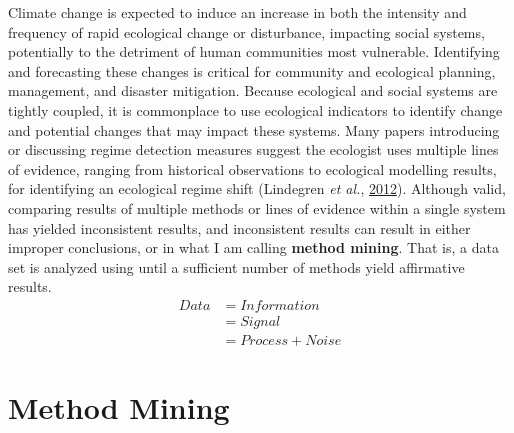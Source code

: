 \documentclass[12pt,twoside,openany]{reedthesis}
\begin{document}
Climate change is expected to induce an increase in both the intensity and frequency of rapid ecological change or disturbance, impacting social systems, potentially to the detriment of human communities most vulnerable. Identifying and forecasting these changes is critical for community and ecological planning, management, and disaster mitigation. Because ecological and social systems are tightly coupled, it is commonplace to use ecological indicators to identify change and potential changes that may impact these systems. Many papers introducing or discussing regime detection measures suggest the ecologist uses multiple lines of evidence, ranging from historical observations to ecological modelling results, for identifying an ecological regime shift (Lindegren \emph{et al.}, \protect\hyperlink{ref-lindegren_early_2012}{2012}). Although valid, comparing results of multiple methods or lines of evidence within a single system has yielded inconsistent results, and inconsistent results can result in either improper conclusions, or in what I am calling \textbf{method mining}. That is, a data set is analyzed using until a sufficient number of methods yield affirmative results.
\begin{equation}
\begin{split}
Data  & = Information \\
& = Signal \\
& = Process + Noise
\end{split}
\label{eq:infoTheory}
\end{equation}
\hypertarget{method-mining}{%
\section{Method Mining}\label{method-mining}}
\end{document}
